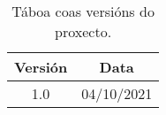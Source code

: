 \documentclass[11pt,a4paper,titlepage,twoside,openright,openbib]{report}
\begin{document}

 
 \setcounter{page}{1}

\begin{table}[h!]
\centering
\begin{tabular}{||c | c||} 
 \hline
 \textbf{Versión} & \textbf{Data}\\ [0.5ex] 
 \hline\hline
 1.0 & 04/10/2021\\ 
 [1ex] 
 \hline
\end{tabular}
\caption{Táboa coas versións do proxecto.}
\label{table:1}
\end{table}

\let\cleardoublepage=\clearpage 

 \tableofcontents

\vspace{30pt}


 
 

 \setcounter{page}{1}
 
  
 
 
 
  \let\cleardoublepage=\clearpage 




%


 
 
  \let\cleardoublepage=\clearpage 
 
\end{document}
